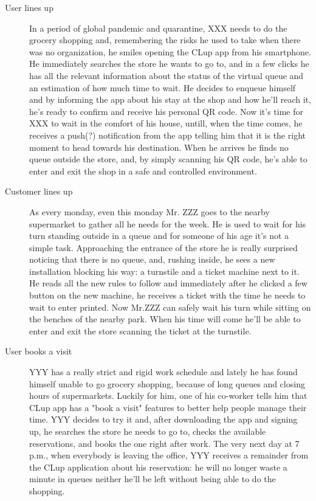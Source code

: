 \begin{description}
    \item[User lines up] 
    In a period of global pandemic and quarantine, XXX needs to do the grocery shopping and, remembering the risks he used to take when there was no organization, he smiles opening the CLup app from his smartphone. He immediately searches the store he wants to go to, and in a few clicks he has all the relevant information about the status of the virtual queue and an estimation of how much time to wait. He decides to enqueue himself and by informing the app about his stay at the shop and how he'll reach it, he's ready to confirm and receive his personal QR code. Now it's time for XXX to wait in the comfort of his house, untill, when the time comes, he receives a push(?) notification from the app telling him that it is the right moment to head towards his destination. When he arrives he finds no queue outside the store, and, by simply scanning his QR code, he's able to enter and exit the shop in a safe and controlled environment.

    \item[Customer lines up]
    As every monday, even this monday Mr. ZZZ goes to the nearby supermarket to gather all he needs for the week. He is used to wait for his turn standing outside in a queue and for someone of his age it's not a simple task. Approaching the entrance of the store he is really surprised noticing that there is no queue, and, rushing inside, he sees a new installation blocking his way: a turnstile and a ticket machine next to it. He reads all the new rules to follow and immediately after he clicked a few button on the new machine, he receives a ticket with the time he needs to wait to enter printed. Now Mr.ZZZ can safely wait his turn while sitting on the benches of the nearby park. When his time will come he'll be able to enter and exit the store scanning the ticket at the turnstile.

    \item[User books a visit]
    YYY has a really strict and rigid work schedule and lately he has found himself unable to go grocery shopping, because of long queues and closing hours of supermarkets. Luckily for him, one of his co-worker tells him that CLup app has a "book a visit" features to better help people manage their time. YYY decides to try it and, after downloading the app and signing up, he searches the store he needs to go to, checks the available reservations, and books the one right after work. The very next day at 7 p.m., when everybody is leaving the office, YYY receives a remainder from the CLup application about his reservation: he will no longer waste a minute in queues neither he'll be left without being able to do the shopping.


\end{description}
